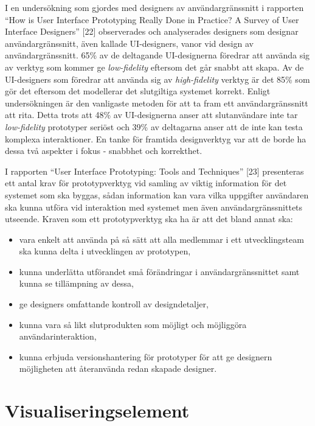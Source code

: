 \documentclass[12pt]{kththesis}
\begin{document}
I en undersökning som gjordes med designers av användargränssnitt i rapporten “How is User Interface Prototyping Really Done in Practice? A Survey of User Interface Designers” [22] observerades och analyserades designers som designar användargränssnitt, även kallade UI-designers, vanor vid design av användargränssnitt. 65\% av de deltagande UI-designerna föredrar att använda sig av verktyg som kommer ge \textit{low-fidelity} eftersom det går snabbt att skapa. Av de UI-designers som föredrar att använda sig av \textit{high-fidelity} verktyg är det 85\% som gör det eftersom det modellerar det slutgiltiga systemet korrekt. Enligt undersökningen är den vanligaste metoden för att ta fram ett användargränssnitt att rita. Detta trots att 48\% av UI-designerna anser att slutanvändare inte tar \textit{low-fidelity} prototyper seriöst och 39\% av deltagarna anser att de inte kan testa komplexa interaktioner. En tanke för framtida designverktyg var att de borde ha dessa två aspekter i fokus - snabbhet och korrekthet. 

I rapporten “User Interface Prototyping: Tools and Techniques” [23] presenteras ett antal krav för prototypverktyg vid samling av viktig information för det systemet som ska byggas, sådan information kan vara vilka uppgifter användaren ska kunna utföra vid interaktion med systemet men även användargränssnittets utseende. Kraven som ett prototypverktyg ska ha är att det bland annat ska: 

\begin{itemize}
\item vara enkelt att använda på så sätt att alla medlemmar i ett utvecklingsteam ska kunna delta i utvecklingen av prototypen,
\item  kunna underlätta utförandet små förändringar i användargränssnittet samt kunna se tillämpning av dessa, 
\item ge designers omfattande kontroll av designdetaljer,
\item kunna vara så likt slutprodukten som möjligt och möjliggöra användarinteraktion, 
\item kunna erbjuda versionshantering för prototyper för att ge designern möjligheten att återanvända redan skapade designer.

\end{itemize}

\section{Visualiseringselement} 
\end{document}

